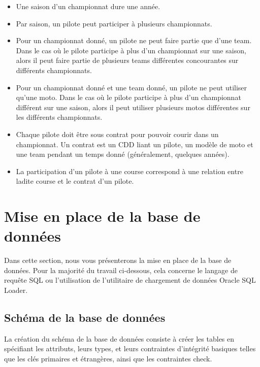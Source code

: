 \documentclass[12pt,a4paper]{article}
\begin{document}
\begin{itemize}
    \item Une saison d'un championnat dure une année.

    \item Par saison, un pilote peut participer à plusieurs championnats.

    \item Pour un championnat donné, un pilote ne peut faire partie que d'une
        team. Dans le cas où le pilote participe à plus d'un championnat sur une
        saison, alors il peut faire partie de plusieurs teams différentes
        concourantes sur différents championnats.

    \item Pour un championnat donné et une team donné, un pilote ne peut
        utiliser qu'une moto. Dans le cas où le pilote participe à plus d'un
        championnat différent sur une saison, alors il peut utiliser plusieurs
        motos différentes sur les différents championnats.

    \item Chaque pilote doit être sous contrat pour pouvoir courir dans un
        championnat. Un contrat est un CDD liant un pilote, un modèle de moto
        et une team pendant un temps donné (généralement, quelques années).

    \item La participation d’un pilote à une course correspond à une relation
        entre ladite course et le contrat d’un pilote.
\end{itemize}

\section{Mise en place de la base de données}
\label{sec.reference}

Dans cette section, nous vous présenterons la mise en place de la base de
données. Pour la majorité du travail ci-dessous, cela concerne le langage de
requête SQL ou l’utilisation de l’utilitaire de chargement de données Oracle SQL
Loader.

\subsection{Schéma de la base de données}
\label{sub.scheme}

La création du schéma de la base de données consiste à créer les tables en
spécifiant les attributs, leurs types, et leurs contraintes d'intégrité
basiques telles que les clés primaires et étrangères, ainsi que les contraintes
check.
\end{document}
